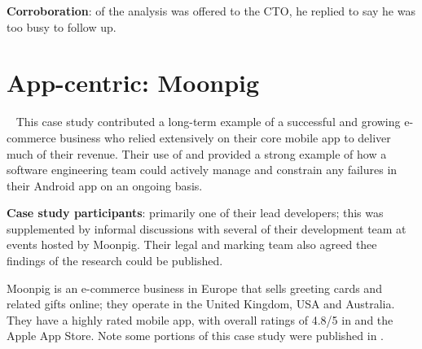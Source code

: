 
\textbf{Corroboration}: of the analysis was offered to the CTO, he replied to say he was too busy to follow up.



\section{App-centric: Moonpig}~\label{case-study-overview-moonpig}
This case study contributed a long-term example of a successful and growing e-commerce business who relied extensively on their core mobile app to deliver much of their revenue. Their use of  and  provided a strong example of how a software engineering team could actively manage and constrain any failures in their Android app on an ongoing basis.

\textbf{Case study participants}: primarily one of their lead developers; this was supplemented by informal discussions with several of their development team at events hosted by Moonpig. Their legal and marking team also agreed thee findings of the research could be published.
    
Moonpig is an e-commerce business in Europe that sells greeting cards and related gifts online; they operate in the United Kingdom, USA and Australia. They have a highly rated mobile app, with overall ratings of 4.8/5 in  and the Apple App Store. Note some portions of this case study were published in .


